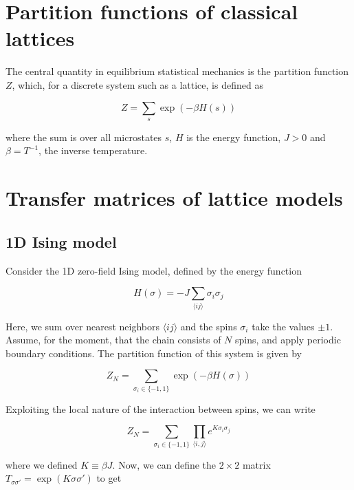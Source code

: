 \section{Partition functions of classical lattices}
The central quantity in equilibrium statistical mechanics is the partition
function $Z$, which, for a discrete system such as a lattice, is defined as

\begin{equation}
  Z = \sum_{s} \exp{(-\beta H(s))}
\end{equation}

where the sum is over all microstates $s$, $H$ is the energy function, $J > 0$ and
$\beta = T^{-1}$, the inverse temperature.

\section{Transfer matrices of lattice models}

\subsection{1D Ising model}


Consider the 1D zero-field Ising model, defined by the energy function

\begin{equation}\label{ising_energy_function}
  H(\sigma) = -J \sum_{\langle i j \rangle} \sigma_i \sigma_j
\end{equation}

Here, we sum over nearest neighbors $\langle i j \rangle$ and the spins
$\sigma_i$ take the values $\pm 1$. Assume, for the moment, that the chain
consists of $N$ spins, and apply periodic boundary conditions.
The partition function of this system is given by

\begin{equation}
  Z_{N} = \sum_{\sigma_i \in \{-1, 1\}} \exp (-\beta H(\sigma))
\end{equation}

Exploiting the local nature of the interaction between spins, we can write

\begin{equation}
  Z_{N} = \sum_{\sigma_i \in \{-1, 1\}} \prod_{\langle i, j \rangle} e^{K\sigma_i \sigma_j}
\end{equation}

where we defined $K \equiv \beta J$. Now, we can define
the $2 \times 2$ matrix $T_{\sigma \sigma'} = \exp(K \sigma \sigma')$ to get

